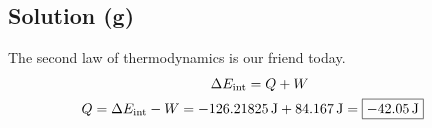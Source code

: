 \documentclass[12pt]{article}
\begin{document}
        \subsection{Solution (g)}
            The second law of thermodynamics is our friend today.
            \begin{gather}
                \Delta E_{\rm int}  =   Q + W\\
                \begin{align}
                    Q   &=  \Delta E_{\rm int} - W
                        =   -126.21825\,\unit{\joule} + 84.167\,\unit{\joule}
                        =   \boxed{-42.05\,\unit{\joule}}
                \end{align}
            \end{gather}
\end{document}
